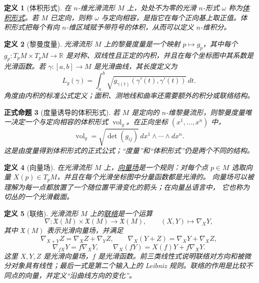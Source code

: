 \documentclass[UTF8,fontset=none,a4paper,11pt]{ctexart}
\theoremstyle{foundation-definition}
\newtheorem{definition}{定义}[section]
\theoremstyle{foundation-theorem}
\theoremstyle{foundation-proposition}
\newtheorem{proposition}[definition]{正式命题}
\theoremstyle{foundation-example}
\theoremstyle{foundation-remark}
\theoremstyle{foundation-theorem}
\newcommand{\term}[2]{\hyperref[#1]{#2}}
\begin{document}
\begin{definition}[体积形式]\label{def:volume-form}
在 \(n\)-维光滑流形 \(M\) 上，处处不为零的光滑 \(n\)-形式 \(\omega\) 称为\term{def:volume-form}{体积形式}。若 \(M\) 已定向，则称 \(\omega\) 与定向相容，是指它在每个正向基上取正值。体积形式把每个有向 \(n\)-维区域赋予带符号的体积，从而可以定义 \(n\)-维积分。
\end{definition}

\begin{definition}[黎曼度量]\label{def:metric}
光滑流形 \(M\) 上的黎曼度量是一个映射 \(p\mapsto g_p\)，其中每个 \(g_p:T_pM\times T_pM\to\mathbb R\) 是对称、双线性且正定的内积，并且在每个坐标图中其系数是光滑函数。若 \(\gamma:[a,b]\to M\) 是光滑曲线，其长度定义为
\[
L_g(\gamma)=\int_a^b\sqrt{g_{\gamma(t)}(\gamma'(t),\gamma'(t))}\,dt.
\]
角度由内积的标准公式定义；面积、测地线和曲率还需要额外的积分或联络结构。
\end{definition}

\begin{proposition}[度量诱导的体积形式]\label{prop:metric-volume-form}
若 \(M\) 是定向的 \(n\)-维黎曼流形，则黎曼度量唯一决定一个与定向相容的体积形式 \(\operatorname{vol}_g\)。在正向坐标 \((x^1,\ldots,x^n)\) 中，
\[
\operatorname{vol}_g=\sqrt{\det(g_{ij})}\,dx^1\wedge\cdots\wedge dx^n.
\]
这是由度量得到体积形式的正式公式；“度量”和“体积形式”仍是两个不同的结构。
\end{proposition}

\begin{definition}[向量场]\label{def:vector-field}
在光滑流形 \(M\) 上，\term{def:vector-field}{向量场}是一个规则：对每个点
\(p\in M\) 选取向量 \(X(p)\in T_pM\)，并且在每个光滑坐标图中分量函数都是光滑的。
向量场可以被理解为每一点都放置了一个随位置平滑变化的箭头；在向量丛语言中，
它也称为切丛的一个光滑截面。
\end{definition}

\begin{definition}[联络]\label{def:connection}
光滑流形 \(M\) 上的\term{def:connection}{联络}是一个运算
\[
\nabla:\mathfrak X(M)\times\mathfrak X(M)\longrightarrow\mathfrak X(M),
\qquad (X,Y)\longmapsto\nabla_XY,
\]
其中 \(\mathfrak X(M)\) 表示光滑向量场，并满足
\[
\nabla_{X+Y}Z=\nabla_XZ+\nabla_YZ,\qquad
\nabla_X(Y+Z)=\nabla_XY+\nabla_XZ,
\]
\[
\nabla_{fX}Y=f\nabla_XY,\qquad
\nabla_X(fY)=X(f)Y+f\nabla_XY.
\]
这里 \(X,Y,Z\) 是光滑向量场，\(f\) 是光滑函数。前三类线性式说明联络对方向和被微分对象具有线性；最后一式是第二个输入上的 Leibniz 规则。联络的作用是比较不同点的向量，并定义“沿曲线方向的变化”。
\end{definition}
\end{document}
